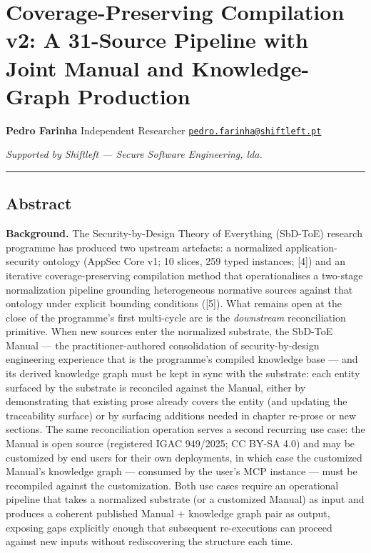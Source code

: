 \documentclass[
]{article}
\author{}
\date{}
\begin{document}
\section{Coverage-Preserving Compilation v2: A 31-Source Pipeline with
Joint Manual and Knowledge-Graph
Production}\label{coverage-preserving-compilation-v2-a-31-source-pipeline-with-joint-manual-and-knowledge-graph-production}

\textbf{Pedro Farinha} Independent Researcher
\href{mailto:pedro.farinha@shiftleft.pt}{\nolinkurl{pedro.farinha@shiftleft.pt}}

\emph{Supported by Shiftleft --- Secure Software Engineering, lda.}

\begin{center}\rule{0.5\linewidth}{0.5pt}\end{center}

\subsection{Abstract}\label{abstract}

\textbf{Background.} The Security-by-Design Theory of Everything
(SbD-ToE) research programme has produced two upstream artefacts: a
normalized application-security ontology (AppSec Core v1; 10 slices, 259
typed instances; {[}4{]}) and an iterative coverage-preserving
compilation method that operationalises a two-stage normalization
pipeline grounding heterogeneous normative sources against that ontology
under explicit bounding conditions ({[}5{]}). What remains open at the
close of the programme's first multi-cycle arc is the \emph{downstream}
reconciliation primitive. When new sources enter the normalized
substrate, the SbD-ToE Manual --- the practitioner-authored
consolidation of security-by-design engineering experience that is the
programme's compiled knowledge base --- and its derived knowledge graph
must be kept in sync with the substrate: each entity surfaced by the
substrate is reconciled against the Manual, either by demonstrating that
existing prose already covers the entity (and updating the traceability
surface) or by surfacing additions needed in chapter re-prose or new
sections. The same reconciliation operation serves a second recurring
use case: the Manual is open source (registered IGAC 949/2025; CC BY-SA
4.0) and may be customized by end users for their own deployments, in
which case the customized Manual's knowledge graph --- consumed by the
user's MCP instance --- must be recompiled against the customization.
Both use cases require an operational pipeline that takes a normalized
substrate (or a customized Manual) as input and produces a coherent
published Manual + knowledge graph pair as output, exposing gaps
explicitly enough that subsequent re-executions can proceed against new
inputs without rediscovering the structure each time.
\end{document}
